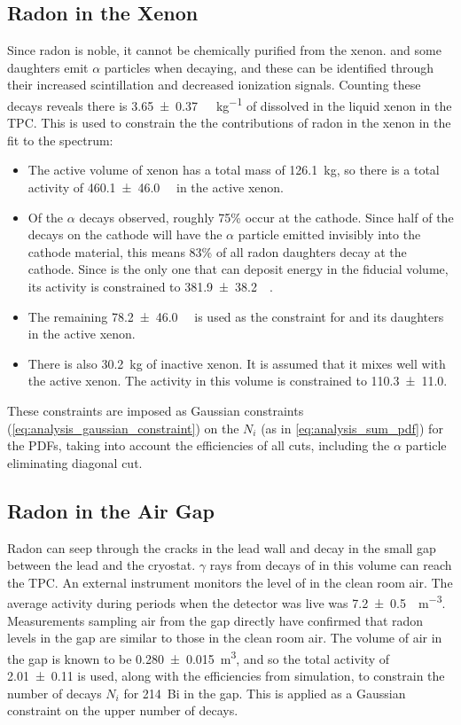 \documentclass[herrin-thesis.tex]{subfiles}
\begin{document}
\subsection{Radon in the Xenon}
Since radon is noble, it cannot be chemically purified from the xenon.  and some daughters emit \(\alpha\) particles when decaying, and these can be identified through their increased scintillation and decreased ionization signals. Counting these decays reveals there is \SI{3.65\pm0.37}{\micro\Bq\per\kg} of  dissolved in the liquid xenon in the TPC. This is used to constrain the the contributions of radon in the xenon in the fit to the spectrum:
\begin{itemize}
\item The active volume of xenon has a total mass of \SI{126.1}{\kg}, so there is a total activity of \SI{460.1\pm46.0}{\micro\Bq} in the active xenon.
\item Of the  \(\alpha\) decays observed, roughly 75\% occur at the cathode. Since half of the decays on the cathode will have the \(\alpha\) particle emitted invisibly into the cathode material, this means 83\% of all radon daughters decay at the cathode. Since  is the only one that can deposit energy in the fiducial volume, its activity is constrained to \SI{381.9\pm38.2}{\micro\Bq}.
\item The remaining \SI{78.2\pm46.0}{\micro\Bq} is used as the constraint for  and its daughters in the active xenon.
\item There is also \SI{30.2}{\kg} of inactive xenon. It is assumed that it mixes well with the active xenon. The activity in this volume is constrained to \SI{110.3\pm11.0}{\Bq}.
\end{itemize}
These constraints are imposed as Gaussian constraints (\cref{eq:analysis_gaussian_constraint}) on the \(N_i\) (as in \cref{eq:analysis_sum_pdf}) for the PDFs, taking into account the efficiencies of all cuts, including the \(\alpha\) particle eliminating diagonal cut.

\subsection{Radon in the Air Gap}
Radon can seep through the cracks in the lead wall and decay in the small gap between the lead and the cryostat. \(\gamma\) rays from decays of  in this volume can reach the TPC. An external instrument\cite{rad7} monitors the level of  in the clean room air. The average activity during periods when the detector was live was \SI{7.2\pm0.5}{\Bq\per\cubic\meter}. Measurements sampling air from the gap directly have confirmed that radon levels in the gap are similar to those in the clean room air. The volume of air in the gap is known to be \SI{.280\pm0.015}{\cubic\meter}, and so the total activity of \SI{2.01\pm 0.11}{\Bq} is used, along with the efficiencies from simulation, to constrain the number of decays \(N_i\) for \SI{214}{Bi} in the gap. This is applied as a Gaussian constraint on the upper number of decays.
\end{document}
